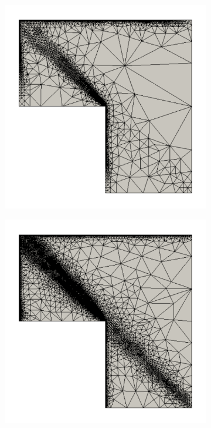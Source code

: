 \begin{figure}[hbt!]
\centering
\begin{subfigure}{.3\textwidth}
\centering
\includegraphics[width=.99\linewidth]{img/vms_lshape_global_spr_final}
\end{subfigure}%
\begin{subfigure}{.3\textwidth}
\centering
\includegraphics[width=.99\linewidth]{img/vms_lshape_global_vms1_final}

\end{subfigure}
\end{figure}
